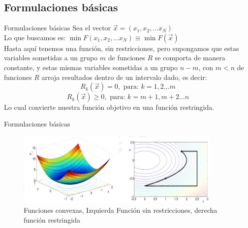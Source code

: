 \documentclass{beamer}
\begin{document}
    \subsection{Formulaciones básicas}
        \begin{frame}{Formulaciones básicas}
            Sea el vector $\vec{x}=(x_{1}, x_{2},...x_{N}) $\\
            Lo que buscamos es: $\min F(x_{1}, x_{2},...x_{N}) \equiv \min F(\vec{x})$\\
            Hasta aquí tenemos una función, sin restricciones, pero 
            supongamos que estas variables sometidas a un grupo $m$ de funciones
            $R$ se comporta de manera constante, y estas mismas variables
            sometidas a un grupo $n-m$, con $m<n$ de funciones $R$ arroja resultados 
            dentro de un intervalo dado, es decir:
            $$R_{k}(\vec{x})=0, \text{ para: } k=1,2...m$$
            $$R_{k}(\vec{x})\geq 0, \text{ para: } k=m+1,m+2...n$$
            Lo cual convierte nuestra función objetivo en una función restringida.

        \end{frame}
        \begin{frame}{Formulaciones básicas}
            \begin{figure}[h]
                \centering
                \captionsetup{justification=centering}
                \includegraphics[width=10cm]{Imagenes/Funciones convexas.jpg}
                \caption{Funciones convexas, 
                Izquierda Función sin restricciones, 
                derecha función restringida}
                \centering
            \end{figure}
        \end{frame}
\end{document}
